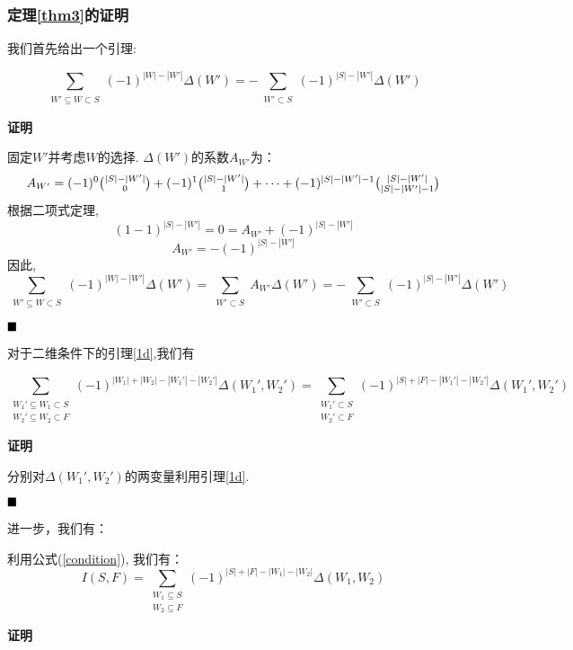 \subsubsection{定理\ref{thm3}的证明}
我们首先给出一个引理:
\begin{lemma}\label{1d}
	\begin{equation}
		\sum_{\substack{W'\subseteq W\subset S}}(-1)^{|W|-|W'|}\Delta(W')
		=-\sum_{\substack{W'\subset S}}(-1)^{|S|-|W'|}\Delta(W')
	\end{equation}
\end{lemma}
\textbf{证明}

固定$W'$并考虑$W$的选择. $\Delta(W')$的系数$A_{W'}$为：
$$A_{W'}=(-1)^0\tbinom{|S|-|W'|}{0}+(-1)^1\tbinom{|S|-|W'|}{1}+\dots+(-1)^{|S|-|W'|-1}\tbinom{|S|-|W'|}{|S|-|W'|-1}$$
根据二项式定理, 
$$(1-1)^{|S|-|W'|}=0=A_{W'}+(-1)^{|S|-|W'|}$$
$$A_{W'}=-(-1)^{|S|-|W'|}$$
因此,
$$\sum_{\substack{W'\subseteq W\subset S}}(-1)^{|W|-|W'|}\Delta(W')=\sum_{\substack{W'\subset S}}A_{W'}\Delta(W')=
-\sum_{\substack{W'\subset S}}(-1)^{|S|-|W'|}\Delta(W')$$

$\hfill\blacksquare$

对于二维条件下的引理\ref{1d},我们有
\begin{lemma}\label{2d}
	\begin{equation}
		\sum_{\substack{W_1'\subseteq W_1\subset S\\W_2'\subseteq W_2\subset F}}(-1)^{|W_1|+|W_2|-|W_1'|-|W_2'|}\Delta(W_1',W_2')
		=\sum_{\substack{W_1'\subset S\\W_2'\subset F}}(-1)^{|S|+|F|-|W_1'|-|W_2'|}\Delta(W_1',W_2')
	\end{equation}
\end{lemma}

\textbf{证明}

分别对$\Delta(W_1', W_2')$的两变量利用引理\ref{1d}.

$\hfill\blacksquare$

进一步，我们有：
\begin{lemma}
	利用公式(\ref{condition}), 我们有：
	\label{lemma_induct}
	\begin{equation}
		I(S,F)=\sum_{\substack{W_1\subseteq S\\ W_2\subseteq F}}(-1)^{|S|+|F|-|W_1|-|W_2|}\Delta(W_1,W_2)\label{induction}
	\end{equation}
\end{lemma}

\textbf{证明}

